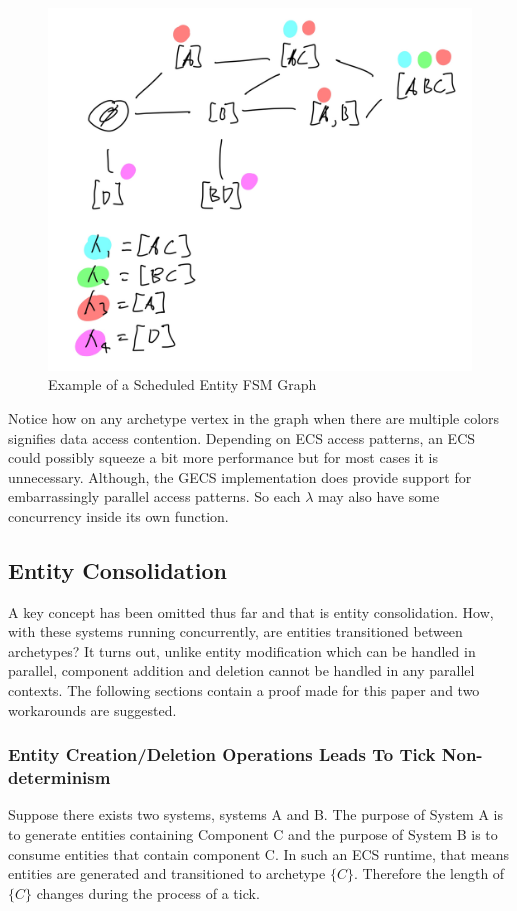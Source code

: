\begin{figure}[H]
    \centering
    \includegraphics[width=0.8\linewidth]{resources/graph2.png}
    \caption{Example of a Scheduled Entity FSM Graph}
    \label{fig:graph2}
\end{figure}
 
Notice how on any archetype vertex in the graph when there are multiple colors signifies data access contention. Depending on ECS access patterns, an ECS could possibly squeeze a bit more performance but for most cases it is unnecessary. Although, the GECS implementation does provide support for embarrassingly parallel access patterns. So each $\lambda$ may also have some concurrency inside its own function.

\subsection{Entity Consolidation}
A key concept has been omitted thus far and that is entity consolidation. How, with these systems running concurrently, are entities transitioned between archetypes? It turns out, unlike entity modification which can be handled in parallel, component addition and deletion cannot be handled in any parallel contexts. The following sections contain a proof made for this paper and two workarounds are suggested.

\subsubsection{Entity Creation/Deletion Operations Leads To Tick Non-determinism}
\label{sec:proof1}
Suppose there exists two systems, systems A and B. The purpose of System A is to generate entities containing Component C and the purpose of System B is to consume entities that contain component C. In such an ECS runtime, that means entities are generated and transitioned to archetype $\{C\}$. Therefore the length of $\{C\}$ changes during the process of a tick. 

